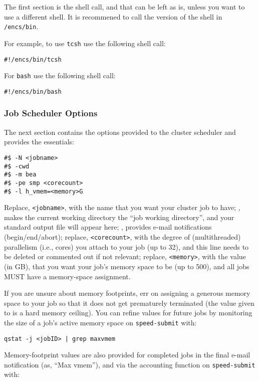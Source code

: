 \documentclass{easychair}
\begin{document}
The first section is the shell call, and that can be left as is, unless 
you want to use a different shell. It is recommened to call the version 
of the shell in \texttt{/encs/bin}. 

For example, to use \texttt{tcsh} use the following shell call:

\begin{verbatim}
#!/encs/bin/tcsh
\end{verbatim}

For \texttt{bash} use the following shell call:
\begin{verbatim}
#!/encs/bin/bash
\end{verbatim}

\subsubsection{Job Scheduler Options}
The next section contains the options provided to the cluster scheduler 
and  provides the essentials:

\begin{verbatim}
#$ -N <jobname>
#$ -cwd
#$ -m bea
#$ -pe smp <corecount>
#$ -l h_vmem=<memory>G
\end{verbatim}

Replace, \verb+<jobname>+, with the name that you want your cluster job to have;
, makes the current working directory the ``job working directory'',
and your standard output file will appear here; , provides e-mail
notifications (begin/end/abort); replace, \verb+<corecount>+, with the degree of
(multithreaded) parallelism (i.e., cores) you attach to your job (up to
32), and this line needs to be deleted or commented out if not relevant;
replace, \verb+<memory>+, with the value (in GB), that you want your job's memory
space to be (up to 500), and all jobs MUST have a memory-space assignment.

If you are unsure about memory footprints, err on assigning a generous
memory space to your job so that it does not get prematurely terminated
(the value given to  is a hard memory ceiling). You can refine
 values for future jobs by monitoring the size of a job's active
memory space on \texttt{speed-submit} with:

\begin{verbatim}
qstat -j <jobID> | grep maxvmem
\end{verbatim}

Memory-footprint values are also provided for completed jobs in the final
e-mail notification (as, ``Max vmem''), and via the accounting function on
\texttt{speed-submit} with:
\end{document}
